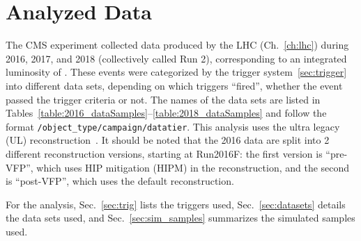 \section{Analyzed Data}
\label{sec:analyzed_data}
The CMS experiment collected data produced by the LHC (Ch.~\ref{ch:lhc}) during 2016, 2017, and 2018 (collectively called Run 2), corresponding to an integrated luminosity of \lumiruntwo.
These events were categorized by the trigger system~\ref{sec:trigger} into different data sets, depending on which triggers ``fired'', \ie whether the event passed the trigger criteria or not.
The names of the data sets are listed in Tables~\ref{table:2016_dataSamples}--\ref{table:2018_dataSamples} and follow the format \texttt{/object\_type/campaign/datatier}.
This analysis uses the ultra legacy (UL) reconstruction~\cite{ultralegacy_twiki}.
It should be noted that the 2016 data are split into 2 different reconstruction versions, starting at Run2016F:
the first version is ``pre-VFP'', which uses HIP mitigation (HIPM) in the reconstruction, and the second is ``post-VFP'', which uses the default reconstruction.

For the \hzzfourl analysis, Sec.~\ref{sec:trig} lists the triggers used, Sec.~\ref{sec:datasets} details the data sets used, and Sec.~\ref{sec:sim_samples} summarizes the simulated samples used.

